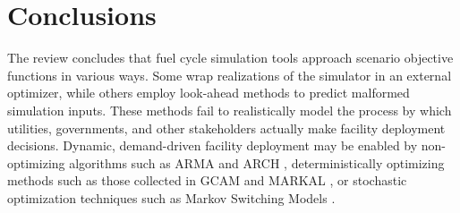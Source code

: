 \section{Conclusions}


        The review concludes that fuel cycle simulation tools approach scenario objective functions in 
        various ways.  Some wrap realizations of the simulator in an external 
        optimizer, while others employ look-ahead methods to predict malformed 
        simulation inputs.  These methods fail to realistically model the 
        process by which utilities, governments, and other stakeholders 
        actually make facility deployment decisions. Dynamic, demand-driven 
        facility deployment may be enabled by non-optimizing algorithms such as 
        \gls{ARMA} \cite{woodard_stationary_2011} and \gls{ARCH} 
        \cite{li_kernel_2016}, deterministically 
        optimizing methods such as those collected in \gls{GCAM} 
        \cite{edmonds_advanced_1994} and \gls{MARKAL} 
        \cite{fishbone_markal_1981}, or stochastic optimization 
        techniques such as Markov Switching Models \cite{ansari_predicting_2015}.

